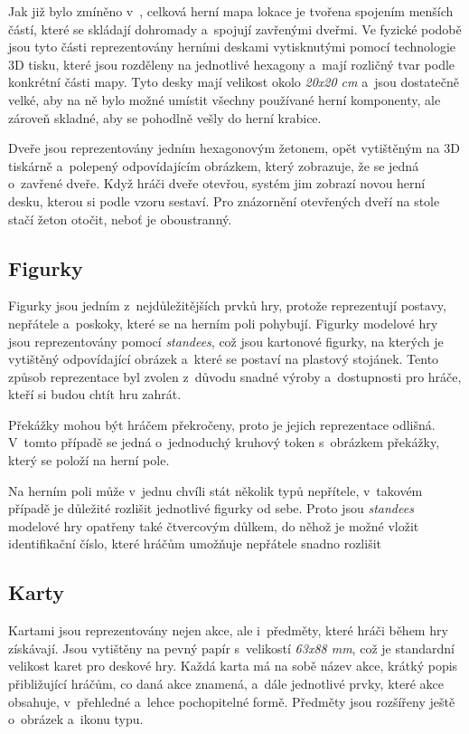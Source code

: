 Jak již bylo zmíněno v~, celková herní mapa lokace je tvořena spojením menších částí, které se skládají dohromady a~spojují zavřenými dveřmi. Ve fyzické podobě jsou tyto části reprezentovány herními deskami vytisknutými pomocí technologie 3D tisku, které jsou rozděleny na jednotlivé hexagony a~mají rozličný tvar podle konkrétní části mapy. Tyto desky mají velikost okolo \textit{20x20 cm} a~jsou dostatečně velké, aby na ně bylo možné umístit všechny používané herní komponenty, ale zároveň skladné, aby se pohodlně vešly do herní krabice.

Dveře jsou reprezentovány jedním hexagonovým žetonem, opět vytištěným na 3D tiskárně a~polepený odpovídajícím obrázkem, který zobrazuje, že se jedná o~zavřené dveře. Když hráči dveře otevřou, systém jim zobrazí novou herní desku, kterou si podle vzoru sestaví. Pro znázornění otevřených dveří na stole stačí žeton otočit, neboť je oboustranný.

\subsection{Figurky}
\label{subsec:design_figurines}

Figurky jsou jedním z~nejdůležitějších prvků hry, protože reprezentují postavy, nepřátele a~poskoky, které se na herním poli pohybují. Figurky modelové hry jsou reprezentovány pomocí \textit{standees}, což jsou kartonové figurky, na kterých je vytištěný odpovídající obrázek a~které se postaví na plastový stojánek. Tento způsob reprezentace byl zvolen z~důvodu snadné výroby a~dostupnosti pro hráče, kteří si budou chtít hru zahrát.

Překážky mohou být hráčem překročeny, proto je jejich reprezentace odlišná. V~tomto případě se jedná o~jednoduchý kruhový token s~obrázkem překážky, který se položí na herní pole.

Na herním poli může v~jednu chvíli stát několik typů nepřítele, v~takovém případě je důležité rozlišit jednotlivé figurky od sebe. Proto jsou \textit{standees} modelové hry opatřeny také čtvercovým důlkem, do něhož je možné vložit identifikační číslo, které hráčům umožňuje nepřátele snadno rozlišit

\subsection{Karty}
\label{subsec:design_cards}

Kartami jsou reprezentovány nejen akce, ale i~předměty, které hráči během hry získávají. Jsou vytištěny na pevný papír s~velikostí \textit{63x88 mm}, což je standardní velikost karet pro deskové hry. Každá karta má na sobě název akce, krátký popis přibližující hráčům, co daná akce znamená, a~dále jednotlivé prvky, které akce obsahuje, v~přehledné a~lehce pochopitelné formě. Předměty jsou rozšířeny ještě o~obrázek a~ikonu typu.

